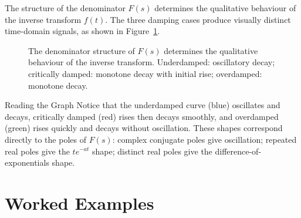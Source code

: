 \documentclass[12pt,a4paper]{article}
\begin{document}
The structure of the denominator $F(s)$ determines the qualitative behaviour of the
inverse transform $f(t)$. The three damping cases produce visually distinct time-domain
signals, as shown in Figure~\ref{fig:damping}.

\begin{figure}[h]
\centering
{}
\caption{The denominator structure of $F(s)$ determines the qualitative behaviour of
         the inverse transform. Underdamped: oscillatory decay; critically damped:
         monotone decay with initial rise; overdamped: monotone decay.}
\label{fig:damping}
\end{figure}

\begin{learnbox}{Reading the Graph}
Notice that the underdamped curve (blue) oscillates and decays, critically damped (red) rises
then decays smoothly, and overdamped (green) rises quickly and decays without oscillation.
These shapes correspond directly to the poles of $F(s)$: complex conjugate poles give
oscillation; repeated real poles give the $te^{-at}$ shape; distinct real poles give the
difference-of-exponentials shape.
\end{learnbox}

\section{Worked Examples}
\end{document}
